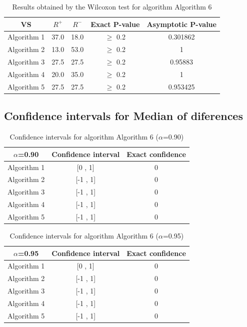 \documentclass[a4paper,10pt]{article}
\begin{document}
\begin{table}[!htp]
\centering\small
\begin{tabular}{
|c|c|c|c|c|}
\hline
 VS & $R^{+}$ & $R^{-}$ & Exact P-value & Asymptotic P-value \\ \hline 
Algorithm 1 & 37.0 & 18.0 & $\geq$ 0.2 & 0.301862\\ \hline 
Algorithm 2 & 13.0 & 53.0 & $\geq$ 0.2 & 1\\ \hline 
Algorithm 3 & 27.5 & 27.5 & $\geq$ 0.2 & 0.95883\\ \hline 
Algorithm 4 & 20.0 & 35.0 & $\geq$ 0.2 & 1\\ \hline 
Algorithm 5 & 27.5 & 27.5 & $\geq$ 0.2 & 0.953425\\ \hline 

\end{tabular}
\caption{Results obtained by the Wilcoxon test for algorithm Algorithm 6}
\end{table}

\subsection{Confidence intervals for Median of diferences}

\begin{table}[!htp]
\centering\small
\begin{tabular}{
|c|c|c|}
\hline
 $\alpha$=0.90 & Confidence interval & Exact confidence \\ \hline 
Algorithm 1 & [0 , 1] & 0\\ \hline 
Algorithm 2 & [-1 , 1] & 0\\ \hline 
Algorithm 3 & [-1 , 1] & 0\\ \hline 
Algorithm 4 & [-1 , 1] & 0\\ \hline 
Algorithm 5 & [-1 , 1] & 0\\ \hline 

\end{tabular}
\caption{Confidence intervals for algorithm Algorithm 6 ($\alpha$=0.90)}
\end{table}
\begin{table}[!htp]
\centering\small
\begin{tabular}{
|c|c|c|}
\hline
 $\alpha$=0.95 & Confidence interval & Exact confidence \\ \hline 
Algorithm 1 & [0 , 1] & 0\\ \hline 
Algorithm 2 & [-1 , 1] & 0\\ \hline 
Algorithm 3 & [-1 , 1] & 0\\ \hline 
Algorithm 4 & [-1 , 1] & 0\\ \hline 
Algorithm 5 & [-1 , 1] & 0\\ \hline 

\end{tabular}
\caption{Confidence intervals for algorithm Algorithm 6 ($\alpha$=0.95)}
\end{table}

 \clearpage 
\end{document}
